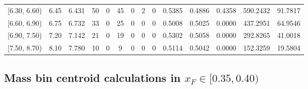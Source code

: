 \begin{table}[htbp]
{\begin{tabular}{cc|c|cccccc|ccc|cc}
        {[6.30, 6.60)} & 6.45 & 6.431 & 50 & 0 & 45 & 0 & 2 & 0 & 0.5385 & 0.4886 & 0.4358 & 590.2432 & 91.7817 \\
        {[6.60, 6.90)} & 6.75 & 6.732 & 33 & 0 & 25 & 0 & 0 & 0 & 0.5008 & 0.5025 & 0.0000 & 437.2951 & 64.9546 \\
        {[6.90, 7.50)} & 7.20 & 7.142 & 21 & 0 & 19 & 0 & 0 & 0 & 0.5302 & 0.5058 & 0.0000 & 292.8265 & 41.0018 \\
        {[7.50, 8.70)} & 8.10 & 7.780 & 10 & 0 & 9 & 0 & 0 & 0 & 0.5114 & 0.5042 & 0.0000 & 152.3259 & 19.5804 \\
        \hline\hline
    \end{tabular}
    }
\end{table}

\clearpage
\subsection{\texorpdfstring{Mass bin centroid calculations in $x_F \in [0.35, 0.40)$}{Mass bin centroid calculations in x\_F in [0.35, 0.40)]}}

